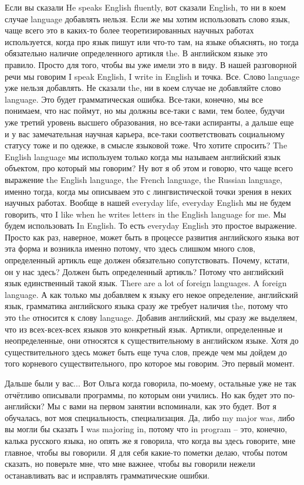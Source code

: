 \documentclass[main.tex]{subfiles}
\begin{document}
Если вы сказали He speaks English fluently, вот сказали English, то ни в коем случае language добавлять нельзя.
Если же мы хотим использовать слово язык, чаще всего это в каких-то более теоретизированных научных работах используется, когда про язык пишут или что-то там, на языке объяснять, но тогда обязательно наличие определенного артикля the.
В английском языке это правило.
Просто для того, чтобы вы уже имели это в виду.
В нашей разговорной речи мы говорим I speak English, I write in English и точка.
Все.
Слово language уже нельзя добавлять.
Не сказали the, ни в коем случае не добавляйте слово language.
Это будет грамматическая ошибка.
Все-таки, конечно, мы все понимаем, что нас поймут, но мы должны все-таки с вами, тем более, будучи уже третий уровень высшего образования, но все-таки аспиранты, а дальше еще и у вас замечательная научная карьера, все-таки соответствовать социальному статусу тоже и по одежке, в смысле языковой тоже.
Что хотите спросить? The English language мы используем только когда мы называем английский язык объектом, про который мы говорим?
Ну вот я об этом и говорю, что чаще всего выражение the English language, the French language, the Russian language, именно тогда, когда мы описываем это с лингвистической точки зрения в неких научных работах.
Вообще в нашей everyday life, everyday English мы не будем говорить, что I like when he writes letters in the English language for me.
Мы будем использовать In English.
То есть everyday English это простое выражение.
Просто как раз, наверное, может быть в процессе развития английского языка вот эта форма и возникла именно потому, что здесь слишком много слов, определенный артикль еще должен обязательно сопутствовать.
Почему, кстати, он у нас здесь?
Должен быть определенный артикль?
Потому что английский язык единственный такой язык.
There are a lot of foreign languages.
A foreign language.
А как только мы добавляем к языку его некое определение, английский язык, грамматика английского языка сразу же требует наличия the, потому что это the относится к слову language.
Добавив английский, мы сразу же выделяем, что из всех-всех-всех языков это конкретный язык.
Артикли, определенные и неопределенные, они относятся к существительному в английском языке.
Хотя до существительного здесь может быть еще туча слов, прежде чем мы дойдем до того корневого существительного, про которое мы говорим.
Это первый момент.

\newpage
{}

Дальше были у вас...
Вот Ольга когда говорила, по-моему, остальные уже не так отчётливо описывали программы, по которым они учились.
Но как будет это по-английски?
Мы с вами на первом занятии вспоминали, как это будет.
Вот я обучалась, вот моя специальность, специализация.
Да, либо my major was, либо вы могли бы сказать I was majoring in, потому что in program -- это, конечно, калька русского языка, но опять же я говорила, что когда вы здесь говорите, мне главное, чтобы вы говорили.
Я для себя какие-то пометки делаю, чтобы потом сказать, но поверьте мне, что мне важнее, чтобы вы говорили нежели останавливать вас и исправлять грамматические ошибки.
\end{document}
